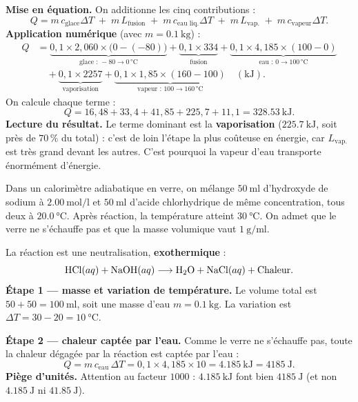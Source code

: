 \documentclass[11pt,a4paper]{article}
\begin{document}
\begin{exemple}
\textbf{Mise en équation.} On additionne les cinq contributions :
\[ Q = m\,c_{\text{glace}}\Delta T \;+\; m\,L_{\text{fusion}} \;+\; m\,c_{\text{eau liq.}}\Delta T
       \;+\; m\,L_{\text{vap.}} \;+\; m\,c_{\text{vapeur}}\Delta T. \]
\textbf{Application numérique} (avec $m=\SI{0.1}{\kilogram}$) :
\begin{align*}
 Q &= \underbrace{0{,}1\times 2{,}060\times\big(0-(-80)\big)}_{\text{glace : }-80\to 0\,\si{\celsius}}
   + \underbrace{0{,}1\times 334}_{\text{fusion}}
   + \underbrace{0{,}1\times 4{,}185\times(100-0)}_{\text{eau : }0\to 100\,\si{\celsius}}\\[2pt]
   &\quad + \underbrace{0{,}1\times 2257}_{\text{vaporisation}}
   + \underbrace{0{,}1\times 1{,}85\times(160-100)}_{\text{vapeur : }100\to 160\,\si{\celsius}} \quad(\si{\kilo\joule}).
\end{align*}
On calcule chaque terme :
\[ Q = 16{,}48 + 33{,}4 + 41{,}85 + 225{,}7 + 11{,}1 = \boxed{\SI{328.53}{\kilo\joule}}. \]
\textbf{Lecture du résultat.} Le terme dominant est la \textbf{vaporisation} ($\SI{225.7}{\kilo\joule}$,
soit près de $70\,\%$ du total) : c'est de loin l'étape la plus coûteuse en énergie, car $L_{\text{vap.}}$
est très grand devant les autres. C'est pourquoi la vapeur d'eau transporte énormément d'énergie.
\end{exemple}

\begin{exemple}
Dans un calorimètre adiabatique en verre, on mélange $\SI{50}{\milli\litre}$ d'hydroxyde de sodium
 à $\SI{2.00}{\mol\per\litre}$ et $\SI{50}{\milli\litre}$ d'acide chlorhydrique  de
même concentration, tous deux à $\SI{20.0}{\celsius}$. Après réaction, la température atteint
$\SI{30}{\celsius}$. On admet que le verre ne s'échauffe pas et que la masse volumique vaut
$\SI{1}{\gram\per\milli\litre}$.

La réaction est une neutralisation, \textbf{exothermique} :
\[ \ce{HCl}(aq) + \ce{NaOH}(aq) \longrightarrow \ce{H2O} + \ce{NaCl}(aq) + \text{Chaleur}. \]
\textbf{Étape 1 — masse et variation de température.} Le volume total est
$50+50 = \SI{100}{\milli\litre}$, soit une masse d'eau $m = \SI{0.1}{\kilogram}$. La variation est
$\Delta T = 30 - 20 = \SI{10}{\celsius}$.

\textbf{Étape 2 — chaleur captée par l'eau.} Comme le verre ne s'échauffe pas, toute la chaleur dégagée
par la réaction est captée par l'eau :
\[ Q = m\,c_{\text{eau}}\,\Delta T = 0{,}1 \times 4{,}185 \times 10 = \SI{4.185}{\kilo\joule}
     = \boxed{\SI{4185}{\joule}}. \]
\textbf{Piège d'unités.} Attention au facteur $1000$ : $\SI{4.185}{\kilo\joule}$ font bien
$\SI{4185}{\joule}$ (et non $\SI{4.185}{\joule}$ ni $\SI{41.85}{\joule}$).
\end{exemple}
\end{document}
